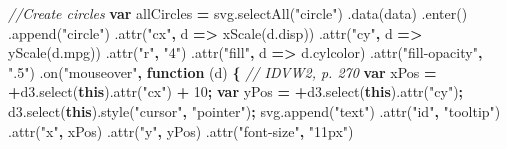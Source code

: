 \documentclass[openany]{book}
\newenvironment{Shaded}{\begin{snugshade}}{\end{snugshade}}
\newcommand{\AttributeTok}[1]{\textcolor[rgb]{0.77,0.63,0.00}{#1}}
\newcommand{\CommentTok}[1]{\textcolor[rgb]{0.56,0.35,0.01}{\textit{#1}}}
\newcommand{\DecValTok}[1]{\textcolor[rgb]{0.00,0.00,0.81}{#1}}
\newcommand{\KeywordTok}[1]{\textcolor[rgb]{0.13,0.29,0.53}{\textbf{#1}}}
\newcommand{\NormalTok}[1]{#1}
\newcommand{\OperatorTok}[1]{\textcolor[rgb]{0.81,0.36,0.00}{\textbf{#1}}}
\newcommand{\StringTok}[1]{\textcolor[rgb]{0.31,0.60,0.02}{#1}}
\newcommand{\VariableTok}[1]{\textcolor[rgb]{0.00,0.00,0.00}{#1}}
\begin{document}
\begin{Shaded}
\begin{Highlighting}[]
    \CommentTok{//Create circles}
  \KeywordTok{var}\NormalTok{ allCircles }\OperatorTok{=} \VariableTok{svg}\NormalTok{.}\AttributeTok{selectAll}\NormalTok{(}\StringTok{"circle"}\NormalTok{)}
\NormalTok{     .}\AttributeTok{data}\NormalTok{(data)}
\NormalTok{     .}\AttributeTok{enter}\NormalTok{()}
\NormalTok{     .}\AttributeTok{append}\NormalTok{(}\StringTok{"circle"}\NormalTok{)}
\NormalTok{     .}\AttributeTok{attr}\NormalTok{(}\StringTok{"cx"}\OperatorTok{,}\NormalTok{ d }\OperatorTok{=>} \AttributeTok{xScale}\NormalTok{(}\VariableTok{d}\NormalTok{.}\AttributeTok{disp}\NormalTok{))}
\NormalTok{     .}\AttributeTok{attr}\NormalTok{(}\StringTok{"cy"}\OperatorTok{,}\NormalTok{ d }\OperatorTok{=>} \AttributeTok{yScale}\NormalTok{(}\VariableTok{d}\NormalTok{.}\AttributeTok{mpg}\NormalTok{))}
\NormalTok{     .}\AttributeTok{attr}\NormalTok{(}\StringTok{"r"}\OperatorTok{,} \StringTok{"4"}\NormalTok{)}
\NormalTok{     .}\AttributeTok{attr}\NormalTok{(}\StringTok{"fill"}\OperatorTok{,}\NormalTok{ d }\OperatorTok{=>} \VariableTok{d}\NormalTok{.}\AttributeTok{cylcolor}\NormalTok{)}
\NormalTok{     .}\AttributeTok{attr}\NormalTok{(}\StringTok{"fill-opacity"}\OperatorTok{,} \StringTok{".5"}\NormalTok{)}
\NormalTok{     .}\AttributeTok{on}\NormalTok{(}\StringTok{"mouseover"}\OperatorTok{,} \KeywordTok{function}\NormalTok{ (d) }\OperatorTok{\{}   \CommentTok{// IDVW2, p. 270}
       \KeywordTok{var}\NormalTok{ xPos }\OperatorTok{=} \OperatorTok{+}\VariableTok{d3}\NormalTok{.}\AttributeTok{select}\NormalTok{(}\KeywordTok{this}\NormalTok{).}\AttributeTok{attr}\NormalTok{(}\StringTok{"cx"}\NormalTok{) }\OperatorTok{+} \DecValTok{10}\OperatorTok{;}
       \KeywordTok{var}\NormalTok{ yPos }\OperatorTok{=} \OperatorTok{+}\VariableTok{d3}\NormalTok{.}\AttributeTok{select}\NormalTok{(}\KeywordTok{this}\NormalTok{).}\AttributeTok{attr}\NormalTok{(}\StringTok{"cy"}\NormalTok{)}\OperatorTok{;}
       \VariableTok{d3}\NormalTok{.}\AttributeTok{select}\NormalTok{(}\KeywordTok{this}\NormalTok{).}\AttributeTok{style}\NormalTok{(}\StringTok{"cursor"}\OperatorTok{,} \StringTok{"pointer"}\NormalTok{)}\OperatorTok{;} 
       \VariableTok{svg}\NormalTok{.}\AttributeTok{append}\NormalTok{(}\StringTok{"text"}\NormalTok{)}
\NormalTok{         .}\AttributeTok{attr}\NormalTok{(}\StringTok{"id"}\OperatorTok{,} \StringTok{"tooltip"}\NormalTok{)}
\NormalTok{         .}\AttributeTok{attr}\NormalTok{(}\StringTok{"x"}\OperatorTok{,}\NormalTok{ xPos)}
\NormalTok{         .}\AttributeTok{attr}\NormalTok{(}\StringTok{"y"}\OperatorTok{,}\NormalTok{ yPos)}
\NormalTok{         .}\AttributeTok{attr}\NormalTok{(}\StringTok{"font-size"}\OperatorTok{,} \StringTok{"11px"}\NormalTok{)}

\end{Highlighting}
\end{Shaded}
\end{document}

